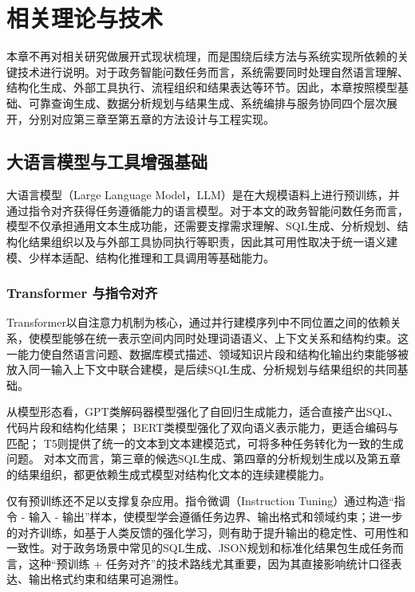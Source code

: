 \chapter{相关理论与技术}

本章不再对相关研究做展开式现状梳理，而是围绕后续方法与系统实现所依赖的关键技术进行说明。对于政务智能问数任务而言，系统需要同时处理自然语言理解、结构化生成、外部工具执行、流程组织和结果表达等环节。因此，本章按照模型基础、可靠查询生成、数据分析规划与结果生成、系统编排与服务协同四个层次展开，分别对应第三章至第五章的方法设计与工程实现。

\section{大语言模型与工具增强基础}

大语言模型（Large Language Model，LLM）是在大规模语料上进行预训练，并通过指令对齐获得任务遵循能力的语言模型。对于本文的政务智能问数任务而言，模型不仅承担通用文本生成功能，还需要支撑需求理解、SQL生成、分析规划、结构化结果组织以及与外部工具协同执行等职责，因此其可用性取决于统一语义建模、少样本适配、结构化推理和工具调用等基础能力。

\subsection{Transformer 与指令对齐}

Transformer以自注意力机制为核心，通过并行建模序列中不同位置之间的依赖关系，使模型能够在统一表示空间内同时处理词语语义、上下文关系和结构约束\cite{vaswani2017Transformer_pages}。这一能力使自然语言问题、数据库模式描述、领域知识片段和结构化输出约束能够被放入同一输入上下文中联合建模，是后续SQL生成、分析规划与结果组织的共同基础。

从模型形态看，GPT类解码器模型\cite{radford2018gpt,radford2019gpt2,brown2020gpt3}强化了自回归生成能力，适合直接产出SQL、代码片段和结构化结果；
BERT类模型\cite{devlin2019bert}强化了双向语义表示能力，更适合编码与匹配；
T5\cite{raffel2020t5}则提供了统一的文本到文本建模范式，可将多种任务转化为一致的生成问题。
对本文而言，第三章的候选SQL生成、第四章的分析规划生成以及第五章的结果组织，都更依赖生成式模型对结构化文本的连续建模能力。

仅有预训练还不足以支撑复杂应用。指令微调（Instruction Tuning）通过构造“指令 - 输入 - 输出”样本，使模型学会遵循任务边界、输出格式和领域约束\cite{wei2022flan,chung2022flanT5}；进一步的对齐训练，如基于人类反馈的强化学习\cite{ouyang2022instructgpt}，则有助于提升输出的稳定性、可用性和一致性。对于政务场景中常见的SQL生成、JSON规划和标准化结果包生成任务而言，这种“预训练 + 任务对齐”的技术路线尤其重要，因为其直接影响统计口径表达、输出格式约束和结果可追溯性\cite{王昀2024}。

